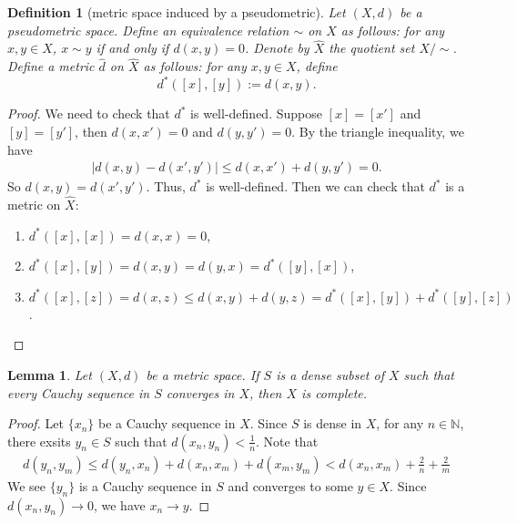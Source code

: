 \documentclass{report}
\newtheorem{definition}{Definition}[section]
\newtheorem{lemma}{Lemma}[section]
\theoremstyle{nonumberplain}
\newtheorem{proof}{Proof.}
\begin{document}
\begin{definition}[metric space induced by a pseudometric]
	Let $(X,d)$ be a pseudometric space. Define an equivalence relation $\sim$ on $X$ as follows: for any $x,y\in X$, $x\sim y$ if and only if $d(x,y)=0$. Denote by $\hat{X}$ the quotient set $X/\sim$. Define a metric $\hat{d}$ on $\hat{X}$ as follows: for any $x,y\in X$, define
	\[
		d^*([x],[y]):=d(x,y).
	\]
\end{definition}
\begin{proof}
	We need to check that $d^*$ is well-defined. Suppose $[x]=[x']$ and $[y]=[y']$, then $d(x,x')=0$ and $d(y,y')=0$. By the triangle inequality, we have
	\begin{align*}
		|d(x,y)-d(x',y')|\le d(x,x')+d(y,y')=0.
	\end{align*}
	So $d(x,y)=d(x',y')$. Thus, $d^*$ is well-defined. 
	Then we can check that $d^*$ is a metric on $\hat{X}$:
	\begin{enumerate}
		\item $d^*([x],[x])=d(x,x)=0$,
		\item $d^*([x],[y])=d(x,y)=d(y,x)=d^*([y],[x])$,
		\item $d^*([x],[z])=d(x,z)\le d(x,y)+d(y,z)=d^*([x],[y])+d^*([y],[z])$.
	\end{enumerate}
\end{proof}

\begin{lemma}
	Let $(X, d)$ be a metric space. If $S$ is a dense subset of $X$ such that every Cauchy sequence in $S$ converges in $X$, then $X$ is complete.
\end{lemma}
\begin{proof}
	Let $\{x_n\}$ be a Cauchy sequence in $X$. Since $S$ is dense in $X$, for any $n\in\mathbb{N}$, there exsits $y_n\in S$ such that $d(x_n,y_n)<\frac{1}{n}$. Note that
	\begin{align*}
		d(y_n,y_m)\le d(y_n,x_n)+d(x_n,x_m)+d(x_m,y_m)<d(x_n,x_m)+\frac{2}{n}+\frac{2}{m}
	\end{align*}
	We see $\{y_n\}$ is a Cauchy sequence in $S$ and converges to some $y\in X$. Since $d(x_n,y_n)\to 0$, we have $x_n\to y$.
\end{proof}
\end{document}
